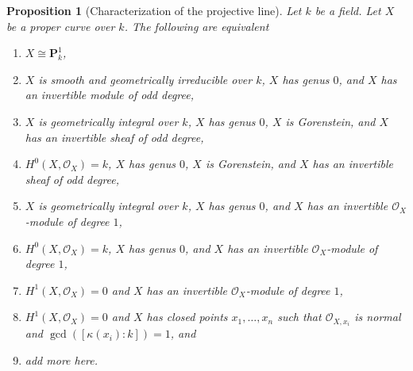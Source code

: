 \documentclass{stacks-project}
\theoremstyle{plain}
\newtheorem{proposition}[subsection]{Proposition}
\theoremstyle{definition}
\theoremstyle{remark}
\numberwithin{equation}{subsection}
\begin{document}
\begin{proposition}[Characterization of the projective line]
\label{proposition-projective-line}
Let $k$ be a field. Let $X$ be a proper curve over $k$.
The following are equivalent
\begin{enumerate}
\item $X \cong \mathbf{P}^1_k$,
\item $X$ is smooth and geometrically irreducible over $k$,
$X$ has genus $0$, and $X$ has an invertible module of odd degree,
\item $X$ is geometrically integral over $k$, $X$ has genus $0$,
$X$ is Gorenstein, and $X$ has an invertible sheaf of odd degree,
\item $H^0(X, \mathcal{O}_X) = k$, $X$ has genus $0$, $X$ is Gorenstein,
and $X$ has an invertible sheaf of odd degree,
\item $X$ is geometrically integral over $k$, $X$ has genus $0$,
and $X$ has an invertible $\mathcal{O}_X$-module of degree $1$,
\item $H^0(X, \mathcal{O}_X) = k$, $X$ has genus $0$,
and $X$ has an invertible $\mathcal{O}_X$-module of degree $1$,
\item $H^1(X, \mathcal{O}_X) = 0$ and $X$ has an invertible
$\mathcal{O}_X$-module of degree $1$,
\item $H^1(X, \mathcal{O}_X) = 0$ and $X$
has closed points $x_1, \ldots, x_n$ such that
$\mathcal{O}_{X, x_i}$ is normal and $\gcd([\kappa(x_i) : k]) = 1$, and
\item add more here.
\end{enumerate}
\end{proposition}
\end{document}
